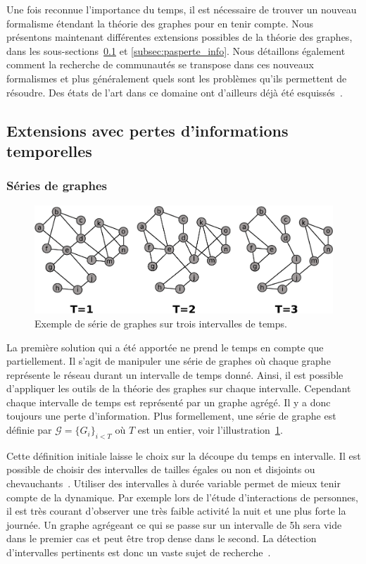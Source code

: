 Une fois reconnue l'importance du temps, il est nécessaire de trouver un nouveau formalisme étendant la théorie des graphes pour en tenir compte.
Nous présentons maintenant différentes extensions possibles de la théorie des graphes, dans les sous-sections~\ref{subsec:perte_info} et \ref{subsec:pasperte_info}.
Nous détaillons également comment la recherche de communautés se transpose dans ces nouveaux formalismes et plus généralement quels sont les problèmes qu'ils permettent de résoudre.
Des états de l'art dans ce domaine ont d'ailleurs déjà été esquissés~\cite{Boccaletti2014,Cazabet2014,hartmann2014clustering}.

\subsection{Extensions avec pertes d'informations temporelles}
\label{subsec:perte_info}
\subsubsection{Séries de graphes}
\begin{figure}[h]
\centering
\includegraphics[width=0.8\linewidth]{img/Intro/TVG.eps}
\caption{Exemple de série de graphes sur trois intervalles de temps.}
\label{fig:exemple_TVG}
\end{figure}
La première solution qui a été apportée ne prend le temps en compte que partiellement.
Il s'agit de manipuler une série de graphes où chaque graphe représente le réseau durant un intervalle de temps donné.
Ainsi, il est possible d'appliquer les outils de la théorie des graphes sur chaque intervalle.
Cependant chaque intervalle de temps est représenté par un graphe agrégé.
Il y a donc toujours une perte d'information.
Plus formellement, une série de graphe est définie par $\mathcal{G}=\{G_i\}_{i < T}$ où $T$ est un entier, voir l'illustration~\ref{fig:exemple_TVG}.

Cette définition initiale laisse le choix sur la découpe du temps en intervalle.
Il est possible de choisir des intervalles de tailles égales ou non et disjoints ou chevauchants~\cite{Wang2012}.
Utiliser des intervalles à durée variable permet de mieux tenir compte de la dynamique.
Par exemple lors de l'étude d'interactions de personnes, il est très courant d'observer une très faible activité la nuit et une plus forte la journée.
Un graphe agrégeant ce qui se passe sur un intervalle de 5h sera vide dans le premier cas et peut être trop dense dans le second.
La détection d'intervalles pertinents est donc un vaste sujet de recherche~\cite{Rosvall2010,Krings2012,Ribeiro2013,Caceres2013,Peel2015,de2016detection}.

